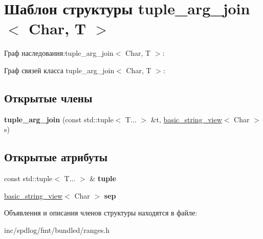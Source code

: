 \hypertarget{structtuple__arg__join}{}\section{Шаблон структуры tuple\+\_\+arg\+\_\+join$<$ Char, T $>$}
\label{structtuple__arg__join}


Граф наследования\+:tuple\+\_\+arg\+\_\+join$<$ Char, T $>$\+:


Граф связей класса tuple\+\_\+arg\+\_\+join$<$ Char, T $>$\+:
\subsection*{Открытые члены}
\begin{DoxyCompactItemize}
\item 
\mbox{\label{structtuple__arg__join_aab11e306d534d41d17a52ddef97ffc1e}} 
{\bfseries tuple\+\_\+arg\+\_\+join} (const std\+::tuple$<$ T... $>$ \&t, \hyperlink{classbasic__string__view}{basic\+\_\+string\+\_\+view}$<$ Char $>$ s)
\end{DoxyCompactItemize}
\subsection*{Открытые атрибуты}
\begin{DoxyCompactItemize}
\item 
\mbox{\label{structtuple__arg__join_a37a43f7ccd08a8258f6f7da003ab3370}} 
const std\+::tuple$<$ T... $>$ \& {\bfseries tuple}
\item 
\mbox{\label{structtuple__arg__join_af23855f613e67a63174b289cab1585a5}} 
\hyperlink{classbasic__string__view}{basic\+\_\+string\+\_\+view}$<$ Char $>$ {\bfseries sep}
\end{DoxyCompactItemize}


Объявления и описания членов структуры находятся в файле\+:\begin{DoxyCompactItemize}
\item 
inc/spdlog/fmt/bundled/ranges.\+h\end{DoxyCompactItemize}
